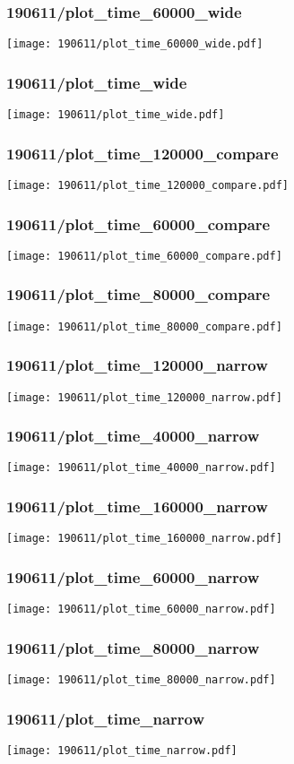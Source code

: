 \begin{frame}
   \frametitle{\small 190611/plot\_time\_60000\_wide}
   \centering
   \texttt{[image: 190611/plot\_time\_60000\_wide.pdf]}
\end{frame}

\begin{frame}
   \frametitle{\small 190611/plot\_time\_wide}
   \centering
   \texttt{[image: 190611/plot\_time\_wide.pdf]}
\end{frame}

\begin{frame}
   \frametitle{\small 190611/plot\_time\_120000\_compare}
   \centering
   \texttt{[image: 190611/plot\_time\_120000\_compare.pdf]}
\end{frame}

\begin{frame}
   \frametitle{\small 190611/plot\_time\_60000\_compare}
   \centering
   \texttt{[image: 190611/plot\_time\_60000\_compare.pdf]}
\end{frame}

\begin{frame}
   \frametitle{\small 190611/plot\_time\_80000\_compare}
   \centering
   \texttt{[image: 190611/plot\_time\_80000\_compare.pdf]}
\end{frame}

\begin{frame}
   \frametitle{\small 190611/plot\_time\_120000\_narrow}
   \centering
   \texttt{[image: 190611/plot\_time\_120000\_narrow.pdf]}
\end{frame}

\begin{frame}
   \frametitle{\small 190611/plot\_time\_40000\_narrow}
   \centering
   \texttt{[image: 190611/plot\_time\_40000\_narrow.pdf]}
\end{frame}

\begin{frame}
   \frametitle{\small 190611/plot\_time\_160000\_narrow}
   \centering
   \texttt{[image: 190611/plot\_time\_160000\_narrow.pdf]}
\end{frame}

\begin{frame}
   \frametitle{\small 190611/plot\_time\_60000\_narrow}
   \centering
   \texttt{[image: 190611/plot\_time\_60000\_narrow.pdf]}
\end{frame}

\begin{frame}
   \frametitle{\small 190611/plot\_time\_80000\_narrow}
   \centering
   \texttt{[image: 190611/plot\_time\_80000\_narrow.pdf]}
\end{frame}

\begin{frame}
   \frametitle{\small 190611/plot\_time\_narrow}
   \centering
   \texttt{[image: 190611/plot\_time\_narrow.pdf]}
\end{frame}

